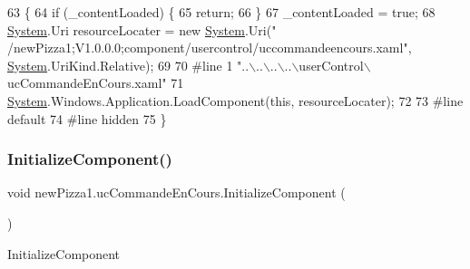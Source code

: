 \begin{DoxyCode}
63                                           \{
64             \textcolor{keywordflow}{if} (\_contentLoaded) \{
65                 \textcolor{keywordflow}{return};
66             \}
67             \_contentLoaded = \textcolor{keyword}{true};
68             \hyperlink{namespaceSystem}{System}.Uri resourceLocater = \textcolor{keyword}{new} \hyperlink{namespaceSystem}{System}.Uri(\textcolor{stringliteral}{"
      /newPizza1;V1.0.0.0;component/usercontrol/uccommandeencours.xaml"}, \hyperlink{namespaceSystem}{System}.UriKind.Relative);
69             
70 \textcolor{preprocessor}{            #line 1 "..\(\backslash\)..\(\backslash\)..\(\backslash\)..\(\backslash\)userControl\(\backslash\)ucCommandeEnCours.xaml"}
71             \hyperlink{namespaceSystem}{System}.Windows.Application.LoadComponent(\textcolor{keyword}{this}, resourceLocater);
72             
73 \textcolor{preprocessor}{            #line default}
74 \textcolor{preprocessor}{            #line hidden}
75         \}
\end{DoxyCode}
\mbox{\label{classnewPizza1_1_1ucCommandeEnCours_a5838b3aa1f180eda285120814af5dadd}} 
\subsubsection{\texorpdfstring{Initialize\+Component()}{InitializeComponent()}\hspace{0.1cm}{\footnotesize\ttfamily [3/6]}}
{\footnotesize\ttfamily void new\+Pizza1.\+uc\+Commande\+En\+Cours.\+Initialize\+Component (\begin{DoxyParamCaption}{ }\end{DoxyParamCaption})\hspace{0.3cm}{\ttfamily [inline]}}



Initialize\+Component 


